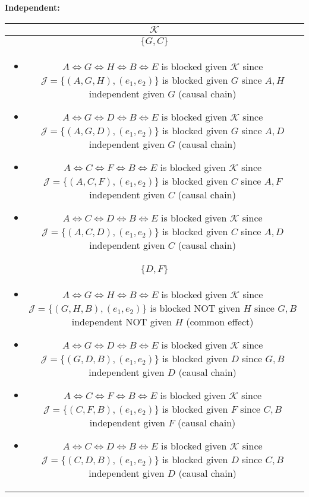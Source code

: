 \begin{example}
    \textbf{Independent:}
    \begin{center}
        \begin{tabular}{c}
            \toprule
            $\mathcal{K}$ \\
            \midrule
            $\{G,C\}$ \\
            \multicolumn{1}{p{\linewidth}}{
                \begin{itemize}
                    \item $A \iff G \iff H \iff B \iff E$ is blocked given $\mathcal{K}$ since $\mathcal{J} = \{(A,G,H),(e_1,e_2)\}$ is blocked given $G$ since $A,H$ independent given $G$ (causal chain)
                    \item $A \iff G \iff D \iff B \iff E$ is blocked given $\mathcal{K}$ since $\mathcal{J} = \{(A,G,D),(e_1,e_2)\}$ is blocked given $G$ since $A,D$ independent given $G$ (causal chain)
                    \item $A \iff C \iff F \iff B \iff E$ is blocked given $\mathcal{K}$ since $\mathcal{J} = \{(A,C,F),(e_1,e_2)\}$ is blocked given $C$ since $A,F$ independent given $C$ (causal chain) 
                    \item $A \iff C \iff D \iff B \iff E$ is blocked given $\mathcal{K}$ since $\mathcal{J} = \{(A,C,D),(e_1,e_2)\}$ is blocked given $C$ since $A,D$ independent given $C$ (causal chain) 
                \end{itemize}} \\
            \midrule
            $\{D,F\}$ \\
            \multicolumn{1}{p{\linewidth}}{
                \begin{itemize}
                    \item $A \iff G \iff H \iff B \iff E$ is blocked given $\mathcal{K}$ since $\mathcal{J} = \{(G,H,B),(e_1,e_2)\}$ is blocked NOT given $H$ since $G,B$ independent NOT given $H$ (common effect)
                    \item $A \iff G \iff D \iff B \iff E$ is blocked given $\mathcal{K}$ since $\mathcal{J} = \{(G,D,B),(e_1,e_2)\}$ is blocked given $D$ since $G,B$ independent given $D$ (causal chain)
                    \item $A \iff C \iff F \iff B \iff E$ is blocked given $\mathcal{K}$ since $\mathcal{J} = \{(C,F,B),(e_1,e_2)\}$ is blocked given $F$ since $C,B$ independent given $F$ (causal chain)
                    \item $A \iff C \iff D \iff B \iff E$ is blocked given $\mathcal{K}$ since $\mathcal{J} = \{(C,D,B),(e_1,e_2)\}$ is blocked given $D$ since $C,B$ independent given $D$ (causal chain)
                \end{itemize}} \\
            \toprule
        \end{tabular}
    \end{center}
    \vspace{1em}


\end{example}
